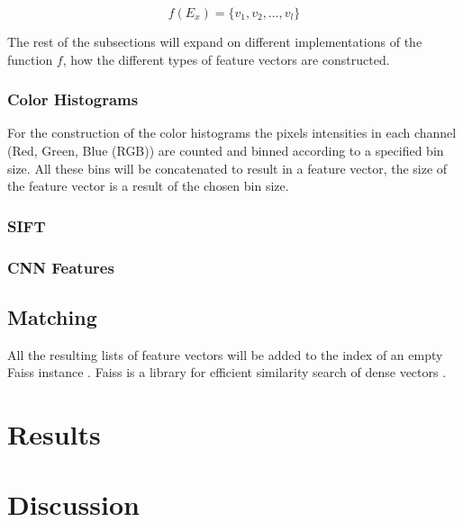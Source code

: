 \documentclass{article}
\begin{document}
\[f(E_x) = \{v_1, v_2, \dots, v_l\}\]

The rest of the subsections will expand on different implementations of the function $f$, how the different types of feature vectors are constructed.

\subsubsection{Color Histograms}
For the construction of the color histograms the pixels intensities in each channel (Red, Green, Blue (RGB)) are counted and binned according to a specified bin size. All these bins will be concatenated to result in a feature vector, the size of the feature vector is a result of the chosen bin size.

\subsubsection{SIFT}

\subsubsection{CNN Features}

\subsection{Matching}

All the resulting lists of feature vectors will be added to the index of an empty Faiss instance \cite{faiss}. Faiss is a library for efficient similarity search of dense vectors .


\section{Results} \label{results}

\section{Discussion} \label{discussion}



\end{document}

